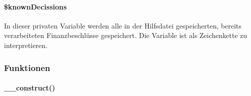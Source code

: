 \documentclass[12pt,parskip=full, pagea4]{scrartcl}
\begin{document}
	\paragraph{\$knownDecissions} In dieser privaten Variable werden alle in der Hilfsdatei gespeicherten, bereits verarbeiteten Finanzbeschlüsse gespeichert. Die Variable ist als Zeichenkette zu interpretieren.
	
	\subsubsection{Funktionen}
	\paragraph{\_\_construct()}
	
\end{document}
